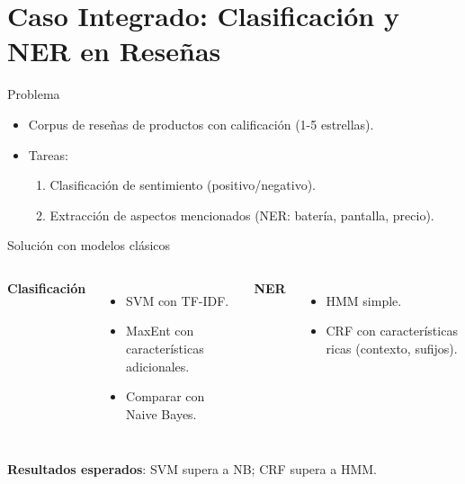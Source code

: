 \documentclass[aspectratio=169, 10pt, xcolor=table]{beamer}
\begin{document}
\section{Caso Integrado: Clasificación y NER en Reseñas}

\begin{frame}{Problema}
    \begin{itemize}
        \item Corpus de reseñas de productos con calificación (1-5 estrellas).
        \item Tareas:
        \begin{enumerate}
            \item Clasificación de sentimiento (positivo/negativo).
            \item Extracción de aspectos mencionados (NER: batería, pantalla, precio).
        \end{enumerate}
    \end{itemize}
\end{frame}

\begin{frame}{Solución con modelos clásicos}
    \begin{columns}[t]
        \textbf{Clasificación}
        \begin{itemize}
            \item SVM con TF-IDF.
            \item MaxEnt con características adicionales.
            \item Comparar con Naive Bayes.
        \end{itemize}
        \textbf{NER}
        \begin{itemize}
            \item HMM simple.
            \item CRF con características ricas (contexto, sufijos).
        \end{itemize}
    \end{columns}
    \vspace{0.3cm}
    \textbf{Resultados esperados}: SVM supera a NB; CRF supera a HMM.
\end{frame}

\end{document}
